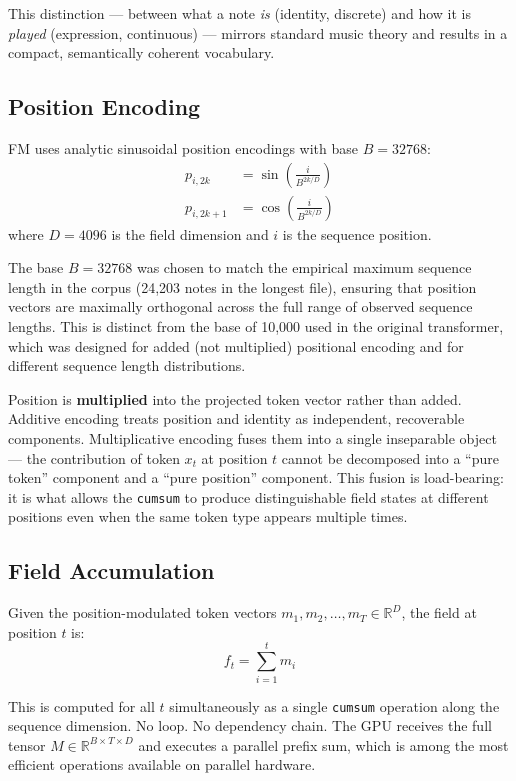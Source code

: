 \documentclass[11pt]{article}
\begin{document}
This distinction — between what a note \textit{is} (identity, discrete) and how it is \textit{played} (expression, continuous) — mirrors standard music theory and results in a compact, semantically coherent vocabulary.

\subsection{Position Encoding}

FM uses analytic sinusoidal position encodings with base $B = 32768$:
\begin{align}
p_{i, 2k}   &= \sin\left(\frac{i}{B^{2k/D}}\right) \\
p_{i, 2k+1} &= \cos\left(\frac{i}{B^{2k/D}}\right)
\end{align}
where $D = 4096$ is the field dimension and $i$ is the sequence position.

The base $B = 32768$ was chosen to match the empirical maximum sequence length in the corpus (24,203 notes in the longest file), ensuring that position vectors are maximally orthogonal across the full range of observed sequence lengths. This is distinct from the base of 10,000 used in the original transformer, which was designed for added (not multiplied) positional encoding and for different sequence length distributions.

Position is \textbf{multiplied} into the projected token vector rather than added. Additive encoding treats position and identity as independent, recoverable components. Multiplicative encoding fuses them into a single inseparable object — the contribution of token $x_t$ at position $t$ cannot be decomposed into a ``pure token'' component and a ``pure position'' component. This fusion is load-bearing: it is what allows the \texttt{cumsum} to produce distinguishable field states at different positions even when the same token type appears multiple times.

\subsection{Field Accumulation}

Given the position-modulated token vectors $m_1, m_2, \ldots, m_T \in \mathbb{R}^{D}$, the field at position $t$ is:
\begin{equation}
f_t = \sum_{i=1}^{t} m_i
\end{equation}

This is computed for all $t$ simultaneously as a single \texttt{cumsum} operation along the sequence dimension. No loop. No dependency chain. The GPU receives the full tensor $M \in \mathbb{R}^{B \times T \times D}$ and executes a parallel prefix sum, which is among the most efficient operations available on parallel hardware.
\end{document}
